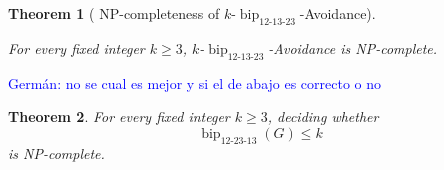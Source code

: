 \documentclass[12pt]{article}
\theoremstyle{plain}
\newtheorem{theorem}{Theorem}[section]
\theoremstyle{definition}
\theoremstyle{remark}
\theoremstyle{definition}
\newcommand{\biplabel}{\mathrm{bip}}
\DeclareRobustCommand{\bipparam}[1]{%
  \ensuremath{\mathop{\biplabel}\nolimits_{#1}}%
}
\newcommand{\german}[1]{%
  \textcolor{blue}{Germán: #1}%
}
\begin{document}
\begin{theorem}[
NP-completeness of
\texorpdfstring{\(k\)-\(\bipparam{12\text{-}13\text{-}23}\)-Avoidance}
{k-bip12-13-23-Avoidance}
]
\label{thm:bip12-13-23-np-complete}

For every fixed integer \(k\ge3\),
\(k\)-\(\bipparam{12\text{-}13\text{-}23}\)-Avoidance is NP-complete.
\end{theorem}

\german{no se cual es mejor y si el de abajo es correcto o no}

\begin{theorem}\label{thm:bip12-23-13-np-complete}
For every fixed integer \(k\ge 3\), deciding whether
\[
\operatorname{bip}_{12\text{-}23\text{-}13}(G)\le k
\]
is NP-complete.
\end{theorem}
\end{document}
